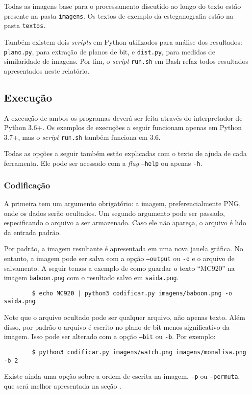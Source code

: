    Todas as imagens base para o processamento discutido ao longo do texto estão presente na pasta \texttt{imagens}. Os textos de exemplo da esteganografia estão na pasta \texttt{textos}.

    Também existem dois \textit{scripts} em Python utilizados para análise dos resultados: \texttt{plano.py}, para extração de planos de bit, e \texttt{dist.py}, para medidas de similaridade de imagens. Por fim, o \textit{script} \texttt{run.sh} em Bash refaz todos resultados apresentados neste relatório.

\subsection{Execução}

    A execução de ambos os programas deverá ser feita através do interpretador de Python 3.6+. Os exemplos de execuções a seguir funcionam apenas em Python 3.7+, mas o \textit{script} \texttt{run.sh} também funciona em 3.6.

    Todas as opções a seguir também estão explicadas com o texto de ajuda de cada ferramenta. Ele pode ser acessado com a \textit{flag} \texttt{--help} ou apenas \texttt{-h}.

    \subsubsection{Codificação}

    A primeira tem um argumento obrigatório: a imagem, preferencialmente PNG, onde os dados serão ocultados. Um segundo argumento pode ser passado, especificando o arquivo a ser armazenado. Caso ele não apareça, o arquivo é lido da entrada padrão.

    Por padrão, a imagem resultante é apresentada em uma nova janela gráfica. No entanto, a imagem pode ser salva com a opção \texttt{--output} ou \texttt{-o} e o arquivo de salvamento. A seguir temos a exemplo de como guardar o texto ``MC920'' na imagem \texttt{baboon.png} com o resultado salvo em \texttt{saida.png}.

    \begin{verbatim}
        $ echo MC920 | python3 codificar.py imagens/baboon.png -o saida.png
    \end{verbatim}

    Note que o arquivo ocultado pode ser qualquer arquivo, não apenas texto. Além disso, por padrão o arquivo é escrito no plano de bit menos significativo da imagem. Isso pode ser alterado com a opção \texttt{--bit} ou \texttt{-b}. Por exemplo:

    \begin{verbatim}
        $ python3 codificar.py imagens/watch.png imagens/monalisa.png -b 2
    \end{verbatim}

    Existe ainda uma opção sobre a ordem de escrita na imagem, \texttt{-p} ou \texttt{--permuta}, que será melhor apresentada na seção .
